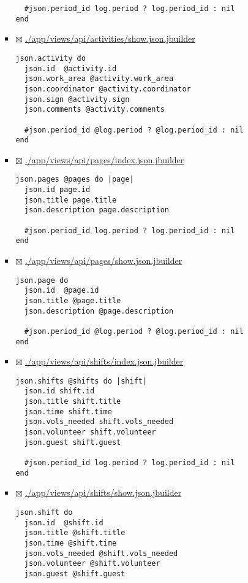 \documentclass[11pt]{article}
\begin{document}
\begin{itemize}
\begin{itemize}
\begin{itemize}
\begin{verbatim}
  #json.period_id log.period ? log.period_id : nil
end
\end{verbatim}

\item $\boxtimes$ \url{./app/views/api/activities/show.json.jbuilder}

\begin{verbatim}
json.activity do
  json.id  @activity.id
  json.work_area @activity.work_area
  json.coordinator @activity.coordinator
  json.sign @activity.sign
  json.comments @activity.comments

  #json.period_id @log.period ? @log.period_id : nil
end
\end{verbatim}

\item $\boxtimes$ \url{./app/views/api/pages/index.json.jbuilder}

\begin{verbatim}
json.pages @pages do |page|
  json.id page.id
  json.title page.title
  json.description page.description

  #json.period_id log.period ? log.period_id : nil
end
\end{verbatim}

\item $\boxtimes$ \url{./app/views/api/pages/show.json.jbuilder}

\begin{verbatim}
json.page do
  json.id  @page.id
  json.title @page.title
  json.description @page.description

  #json.period_id @log.period ? @log.period_id : nil
end
\end{verbatim}

\item $\boxtimes$ \url{./app/views/api/shifts/index.json.jbuilder}

\begin{verbatim}
json.shifts @shifts do |shift|
  json.id shift.id
  json.title shift.title
  json.time shift.time
  json.vols_needed shift.vols_needed
  json.volunteer shift.volunteer
  json.guest shift.guest

  #json.period_id log.period ? log.period_id : nil
end
\end{verbatim}

\item $\boxtimes$ \url{./app/views/api/shifts/show.json.jbuilder}

\begin{verbatim}
json.shift do
  json.id  @shift.id
  json.title @shift.title
  json.time @shift.time
  json.vols_needed @shift.vols_needed
  json.volunteer @shift.volunteer
  json.guest @shift.guest


\end{verbatim}
\end{itemize}
\end{itemize}
\end{itemize}
\end{document}
